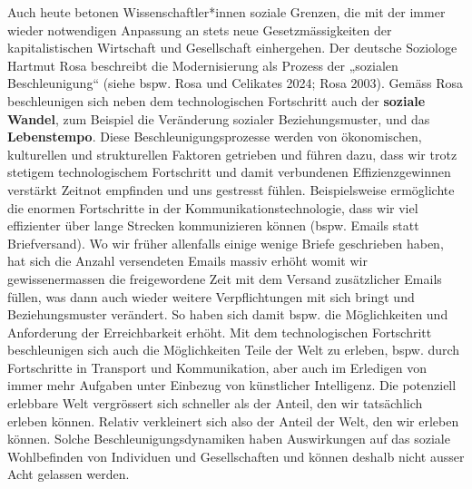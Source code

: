 \documentclass[
  nswissgerman,
  a4paper,
  DIV=11,
  numbers=noendperiod,
  oneside,
  openany]{scrreprt}
\begin{document}
Auch heute betonen Wissenschaftler*innen soziale Grenzen, die mit der
immer wieder notwendigen Anpassung an stets neue Gesetzmässigkeiten der
kapitalistischen Wirtschaft und Gesellschaft einhergehen. Der deutsche
Soziologe Hartmut Rosa beschreibt die Modernisierung als Prozess der
„sozialen Beschleunigung`` (siehe bspw. Rosa und Celikates 2024; Rosa
2003). Gemäss Rosa beschleunigen sich neben dem technologischen
Fortschritt auch der \textbf{soziale Wandel}, zum Beispiel die
Veränderung sozialer Beziehungsmuster, und das \textbf{Lebenstempo}.
Diese Beschleunigungsprozesse werden von ökonomischen, kulturellen und
strukturellen Faktoren getrieben und führen dazu, dass wir trotz
stetigem technologischem Fortschritt und damit verbundenen
Effizienzgewinnen verstärkt Zeitnot empfinden und uns gestresst fühlen.
Beispielsweise ermöglichte die enormen Fortschritte in der
Kommunikationstechnologie, dass wir viel effizienter über lange Strecken
kommunizieren können (bspw. Emails statt Briefversand). Wo wir früher
allenfalls einige wenige Briefe geschrieben haben, hat sich die Anzahl
versendeten Emails massiv erhöht womit wir gewissenermassen die
freigewordene Zeit mit dem Versand zusätzlicher Emails füllen, was dann
auch wieder weitere Verpflichtungen mit sich bringt und Beziehungsmuster
verändert. So haben sich damit bspw. die Möglichkeiten und Anforderung
der Erreichbarkeit erhöht. Mit dem technologischen Fortschritt
beschleunigen sich auch die Möglichkeiten Teile der Welt zu erleben,
bspw. durch Fortschritte in Transport und Kommunikation, aber auch im
Erledigen von immer mehr Aufgaben unter Einbezug von künstlicher
Intelligenz. Die potenziell erlebbare Welt vergrössert sich schneller
als der Anteil, den wir tatsächlich erleben können. Relativ verkleinert
sich also der Anteil der Welt, den wir erleben können. Solche
Beschleunigungsdynamiken haben Auswirkungen auf das soziale Wohlbefinden
von Individuen und Gesellschaften und können deshalb nicht ausser Acht
gelassen werden.
\end{document}
